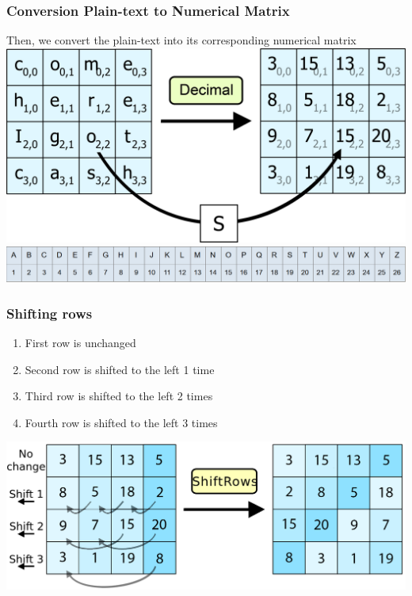 \documentclass[11pt]{beamer}
\begin{document}
\begin{frame}\frametitle{Conversion Plain-text to Numerical Matrix}
\footnotesize Then, we convert the plain-text into its corresponding numerical matrix 
\center \includegraphics[scale=0.275]{conversion_AES_1.png}
\center \includegraphics[scale=0.275]{numerical.png}
\end{frame}

\begin{frame}\frametitle{Shifting rows}
	\begin{enumerate}[1]
		\item First row is unchanged
		\item Second row is shifted to the left 1 time
		\item Third row is shifted to the left 2 times
		\item Fourth row is shifted to the left 3 times
	\end{enumerate}	
	\center \includegraphics[scale=0.15]{shift_rows_1.png}
\end{frame}
\end{document}
